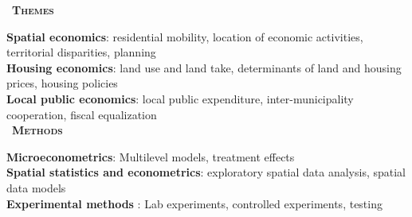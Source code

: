 \documentclass[a4paper,12pt]{article}
\newcommand{\smalltitre}[1]{%
	\noindent \textbullet~\textsc{\textbf{#1}}
	\smallskip
	}
\begin{document}

	

\smalltitre{Themes} \smallskip

\noindent \textbf{Spatial economics}: residential mobility, location of economic activities, territorial disparities, planning \smallskip \\ 
\noindent \textbf{Housing economics}: land use and land take, determinants of land and housing prices, housing policies \smallskip \\ 
\textbf{Local public economics}: local public expenditure, inter-municipality cooperation, fiscal equalization \smallskip \\ 

\smalltitre{Methods} 

\noindent \textbf{Microeconometrics}: Multilevel models, treatment effects \smallskip \\ 
\textbf{Spatial statistics and econometrics}: exploratory spatial data analysis, spatial data models \smallskip \\ 
\textbf{Experimental methods} : Lab experiments, controlled experiments, testing \smallskip \\ 
	
\end{document}
